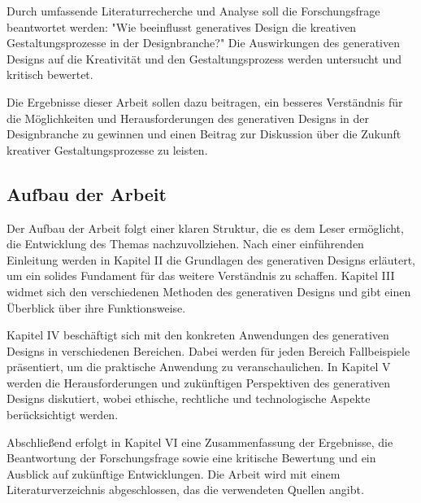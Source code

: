 Durch umfassende Literaturrecherche und Analyse soll die Forschungsfrage beantwortet werden: "Wie beeinflusst generatives Design die kreativen Gestaltungsprozesse in der Designbranche?" Die Auswirkungen des generativen Designs auf die Kreativität und den Gestaltungsprozess werden untersucht und kritisch bewertet.

Die Ergebnisse dieser Arbeit sollen dazu beitragen, ein besseres Verständnis für die Möglichkeiten und Herausforderungen des generativen Designs in der Designbranche zu gewinnen und einen Beitrag zur Diskussion über die Zukunft kreativer Gestaltungsprozesse zu leisten.

\subsection{Aufbau der Arbeit}

Der Aufbau der Arbeit folgt einer klaren Struktur, die es dem Leser ermöglicht, die Entwicklung des Themas nachzuvollziehen. Nach einer einführenden Einleitung werden in Kapitel II die Grundlagen des generativen Designs erläutert, um ein solides Fundament für das weitere Verständnis zu schaffen. Kapitel III widmet sich den verschiedenen Methoden des generativen Designs und gibt einen Überblick über ihre Funktionsweise.

Kapitel IV beschäftigt sich mit den konkreten Anwendungen des generativen Designs in verschiedenen Bereichen. Dabei werden für jeden Bereich Fallbeispiele präsentiert, um die praktische Anwendung zu veranschaulichen. In Kapitel V werden die Herausforderungen und zukünftigen Perspektiven des generativen Designs diskutiert, wobei ethische, rechtliche und technologische Aspekte berücksichtigt werden.

Abschließend erfolgt in Kapitel VI eine Zusammenfassung der Ergebnisse, die Beantwortung der Forschungsfrage sowie eine kritische Bewertung und ein Ausblick auf zukünftige Entwicklungen. Die Arbeit wird mit einem Literaturverzeichnis abgeschlossen, das die verwendeten Quellen angibt.
